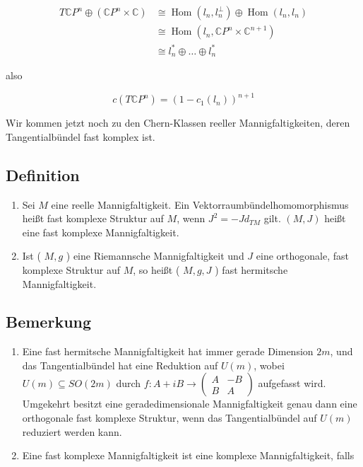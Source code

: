 \documentclass[10pt, letterpaper]{article}
\begin{document}
$$
\begin{aligned}
T \mathbb{C} P^{n} \oplus\left(\mathbb{C} P^{n} \times \mathbb{C}\right) & \cong \operatorname{Hom}\left(l_{n}, l_{n}^{\perp}\right) \oplus \operatorname{Hom}\left(l_{n}, l_{n}\right) \\
& \cong \operatorname{Hom}\left(l_{n}, \mathbb{C} P^{n} \times \mathbb{C}^{n+1}\right) \\
& \cong l_{n}^{*} \oplus \ldots \oplus l_{n}^{*}
\end{aligned}
$$

also

$$
c\left(T \mathbb{C} P^{n}\right)=\left(1-c_{1}\left(l_{n}\right)\right)^{n+1}
$$

Wir kommen jetzt noch zu den Chern-Klassen reeller Mannigfaltigkeiten, deren Tangentialbündel fast komplex ist.

\subsection*{Definition}
\begin{enumerate}
  \item Sei $M$ eine reelle Mannigfaltigkeit. Ein Vektorraumbündelhomomorphismus heißt fast komplexe Struktur auf $M$, wenn $J^{2}=-J d_{T M}$ gilt. $(M, J)$ heißt eine fast komplexe Mannigfaltigkeit.
  \item Ist ( $M, g$ ) eine Riemannsche Mannigfaltigkeit und $J$ eine orthogonale, fast komplexe Struktur auf $M$, so heißt ( $M, g, J$ ) fast hermitsche Mannigfaltigkeit.
\end{enumerate}

\subsection*{Bemerkung}
\begin{enumerate}
  \item Eine fast hermitsche Mannigfaltigkeit hat immer gerade Dimension $2 m$, und das Tangentialbündel hat eine Reduktion auf $U(m)$, wobei $U(m) \subseteq S O(2 m)$ durch $f: A+i B \rightarrow\left(\begin{array}{cc}A & -B \\ B & A\end{array}\right)$ aufgefasst wird. Umgekehrt besitzt eine geradedimensionale Mannigfaltigkeit genau dann eine orthogonale fast komplexe Struktur, wenn das Tangentialbündel auf $U(m)$ reduziert werden kann.
  \item Eine fast komplexe Mannigfaltigkeit ist eine komplexe Mannigfaltigkeit, falls
\end{enumerate}
\end{document}
